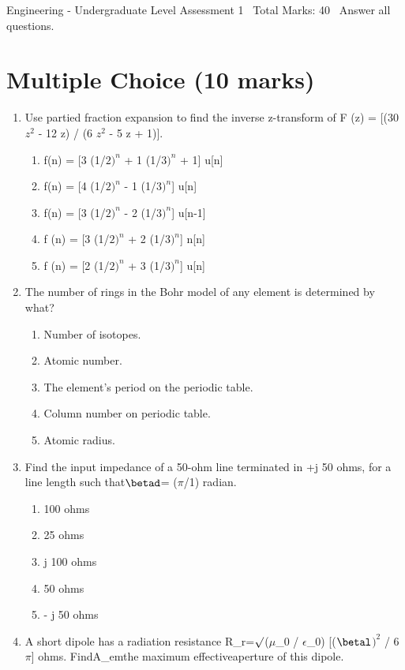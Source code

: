 \documentclass[12pt]{article}
\begin{document}
\begin{center}
Engineering - Undergraduate Level Assessment 1 \
Total Marks: 40 \
Answer all questions.
\end{center}

\section*{Multiple Choice (10 marks)}
\begin{enumerate}[label=\arabic*.]
\item Use partied fraction expansion to find the inverse z-transform of F (z) = [(30 $z^2$ - 12 z) / (6 $z^2$ - 5 z + 1)].
\begin{enumerate}[label=(\alph*)]
    \item f(n) = [3 (1/$2)^n$ + 1 (1/$3)^n$ + 1] u[n]
    \item f(n) = [4 (1/$2)^n$ - 1 (1/$3)^n$] u[n]
    \item f(n) = [3 (1/$2)^n$ - 2 (1/$3)^n$] u[n-1]
    \item f (n) = [3 (1/$2)^n$ + 2 (1/$3)^n$] n[n]
    \item f (n) = [2 (1/$2)^n$ + 3 (1/$3)^n$] u[n]
\end{enumerate}
\item The number of rings in the Bohr model of any element is determined by what?
\begin{enumerate}[label=(\alph*)]
    \item Number of isotopes.
    \item Atomic number.
    \item The element's period on the periodic table.
    \item Column number on periodic table.
    \item Atomic radius.
\end{enumerate}
\item Find the input impedance of a 50-ohm line terminated in +j 50 ohms, for a line length such that\ensuremath{\betad}= (\ensuremath{\pi}/1) radian.
\begin{enumerate}[label=(\alph*)]
    \item 100 ohms
    \item 25 ohms
    \item j 100 ohms
    \item 50 ohms
    \item - j 50 ohms
\end{enumerate}
\item A short dipole has a radiation resistance R\_r=\ensuremath{\surd}(\ensuremath{\mu}\_0 / \ensuremath{\epsilon}\_0) [(\ensuremath{\betal}$)^2$ / 6\ensuremath{\pi}] ohms. FindA\_emthe maximum effectiveaperture of this dipole.

\end{enumerate}
\end{document}
